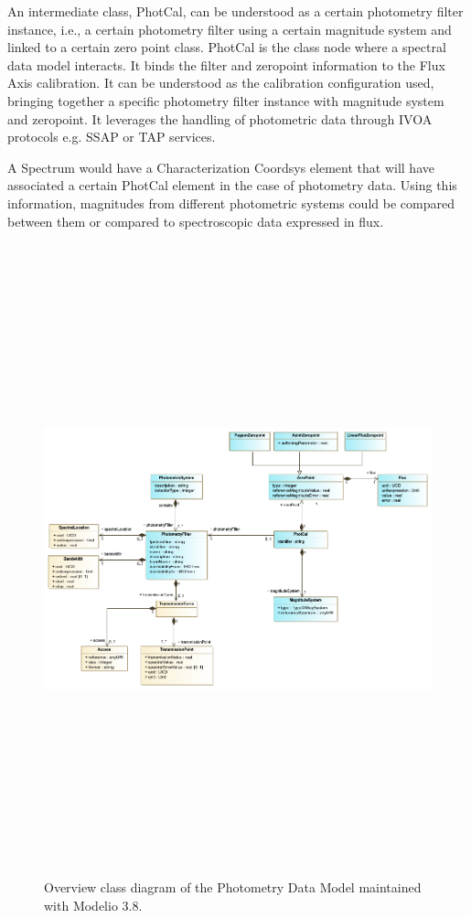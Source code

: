 \documentclass[11pt,a4paper]{ivoa}
\begin{document}
An intermediate class, PhotCal, can be understood as a certain photometry
filter instance, i.e., a certain photometry filter using a certain magnitude
system and linked to a certain zero point class.
PhotCal is the class node where a spectral data model interacts.
It binds the filter and
zeropoint information to the Flux Axis calibration. It can be understood as the
calibration configuration used, bringing together a specific photometry filter
instance with magnitude system and zeropoint. It leverages the handling of
photometric data through IVOA protocols e.g. SSAP or TAP services.
\par

A Spectrum would have a Characterization Coordsys element that will have
associated a certain PhotCal element in the case of photometry data. Using
this information, magnitudes from different photometric systems could be
compared between them or compared to spectroscopic data expressed in flux.
\par

\begin{figure}[H]
\includegraphics[angle=90,width=5.98in,height=7.19in]{./schema/PhotometryOverviewDiagram_20220520.png} 
\caption{Overview class diagram of the Photometry Data Model maintained with Modelio 3.8.}
\end{figure}
\end{document}
